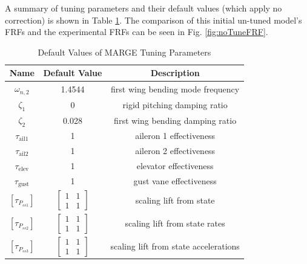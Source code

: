 A summary of tuning parameters and their default values (which apply no correction) is shown in Table \ref{tab:tuningParams}. The comparison of this initial un-tuned model's FRFs and the experimental FRFs can be seen in Fig. \ref{fig:noTuneFRF}.
\begin{table}[h]
	\centering
	\label{tab:tuningParams}
	\caption{Default Values of MARGE Tuning Parameters}
	\begin{tabular}{ccc}
		\hline\hline
		Name & Default Value & Description \\
		\hline
		$\omega_{n,2}$ & 1.4544 & first wing bending mode frequency \\
		$\zeta_1$ & 0 & rigid pitching damping ratio \\
		$\zeta_2$ & 0.028 & first wing bending damping ratio \\
		$\tau_\text{ail1}$ & 1 & aileron 1 effectiveness \\
		$\tau_\text{ail2}$ & 1 & aileron 2 effectiveness \\
		$\tau_\text{elev}$ & 1 & elevator effectiveness \\
		$\tau_\text{gust}$ & 1 & gust vane effectiveness \\
		$\left[\tau_{P_{ss1}}\right]$ & $\begin{bmatrix} 1 & 1 \\ 1 & 1 \end{bmatrix}$ & scaling lift from state \\
		$\left[\tau_{P_{ss2}}\right]$ & $\begin{bmatrix} 1 & 1 \\ 1 & 1 \end{bmatrix}$ & scaling lift from state rates \\
		$\left[\tau_{P_{ss3}}\right]$ & $\begin{bmatrix} 1 & 1 \\ 1 & 1 \end{bmatrix}$ & scaling lift from state accelerations \\
		\hline\hline
	\end{tabular}
\end{table}

